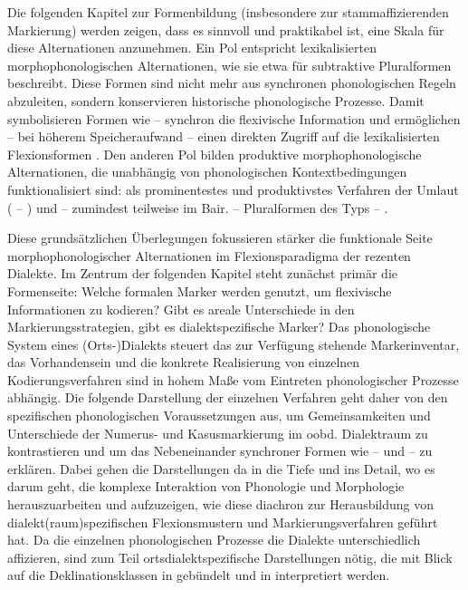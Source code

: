 Die folgenden Kapitel zur Formenbildung (insbesondere  zur stammaffizierenden Markierung) werden zeigen, dass es sinnvoll und praktikabel ist, eine Skala für diese Alternationen anzunehmen. Ein Pol entspricht lexikalisierten morphophonologischen Alternationen, wie sie etwa \citet{Birkenes2014} für subtraktive Pluralformen beschreibt. Diese Formen sind nicht mehr aus synchronen phonologischen Regeln abzuleiten, sondern konservieren historische phonologische Prozesse. Damit symbolisieren Formen wie  --  synchron die flexivische Information und ermöglichen -- bei höherem Speicheraufwand -- einen direkten Zugriff auf die lexikalisierten Flexionsformen \citep[59]{Harnisch1990}. Den anderen Pol bilden produktive morphophonologische Alternationen, die unabhängig von phonologischen Kontextbedingungen funktionalisiert sind: als prominentestes und produktivstes Verfahren der Umlaut ( -- ) und -- zumindest teilweise im Bair. -- Pluralformen des Typs  -- .

Diese grundsätzlichen Überlegungen fokussieren stärker die funktionale Seite morphophonologischer Alternationen im Flexionsparadigma der rezenten Dialekte. Im Zentrum der folgenden Kapitel steht zunächst primär die Formenseite: Welche formalen Marker werden genutzt, um flexivische Informationen zu kodieren? Gibt es areale Unterschiede in den Markierungsstrategien, gibt es dialektspezifische Marker? Das phonologische System eines (Orts-)Dialekts steuert das zur Verfügung stehende Markerinventar, das Vorhandensein und die konkrete Realisierung von einzelnen Kodierungsverfahren sind in hohem Maße vom Eintreten phonologischer Prozesse abhängig. Die folgende Darstellung der einzelnen Verfahren geht daher von den spezifischen phonologischen Voraussetzungen aus, um Gemeinsamkeiten und Unterschiede der Numerus- und Kasusmarkierung im oobd. Dialektraum zu kontrastieren und um das Nebeneinander synchroner Formen wie  --  und  --  zu erklären. Dabei gehen die Darstellungen da in die Tiefe und ins Detail, wo es darum geht, die komplexe Interaktion von Phonologie und Morphologie herauszuarbeiten und aufzuzeigen, wie diese diachron zur Herausbildung von dialekt(raum)spezifischen Flexionsmustern und Markierungsverfahren geführt hat. Da die einzelnen phonologischen Prozesse die Dialekte unterschiedlich affizieren, sind zum Teil ortsdialektspezifische Darstellungen nötig, die mit Blick auf die Deklinationsklassen in  gebündelt und in  interpretiert werden.

